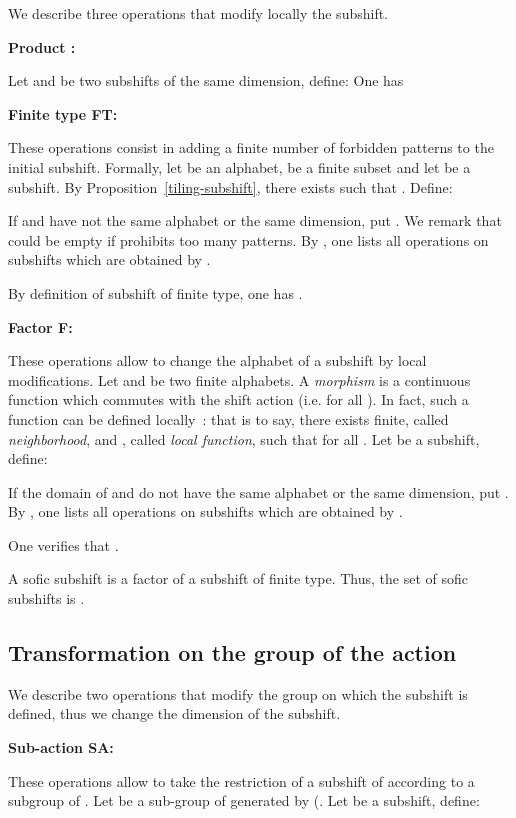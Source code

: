 \documentclass[proceedings]{stacs}
\theoremstyle{plain}\newtheorem{satz}[thm]{Satz}
\theoremstyle{definition}\newtheorem{crucial}[thm]{Crucial Definition}
\begin{document}
We describe three operations that modify locally the subshift.

\noindent \textbf{Product :}

Let  and  be two subshifts of the same dimension, define: 
One has 

\noindent \textbf{Finite type FT:}

These operations consist in adding a finite number of forbidden patterns to the initial subshift. Formally, let  be an alphabet,  be a finite subset and let  be a subshift. By Proposition~\ref{tiling-subshift}, there exists  such that . Define:


If  and  have not the same alphabet or the same dimension, put . We remark that  could be empty if  prohibits too many patterns. By , one lists all operations on subshifts which are obtained by .

By definition of subshift of finite type, one has .

\noindent \textbf{Factor F:}

These operations allow to change the alphabet of a subshift by local modifications. Let  and  be two finite alphabets. A \emph{morphism}  is a continuous function which commutes with the shift action (i.e.  for all ). In fact, such a function can be defined locally~\cite{hedlund1969eaa}: that is to say, there exists  finite, called \emph{neighborhood}, and , called \emph{local function}, such that  for all . Let  be a subshift, define:


If the domain of  and  do not have the same alphabet or the same dimension, put . By , one lists all operations on subshifts which are obtained by .

One verifies that .

\begin{definition}
A sofic subshift is a factor of a subshift of finite type. Thus, the set of sofic subshifts is .
\end{definition}


	\subsection{Transformation on the group of the action}

We describe two operations that modify the group on which the subshift is defined, thus we change the dimension of the subshift.

\noindent  \textbf{Sub-action SA:}

These operations allow to take the restriction of a subshift of  according to a subgroup of . Let  be a sub-group of  generated by  (. Let  be a subshift, define:
\end{document}

